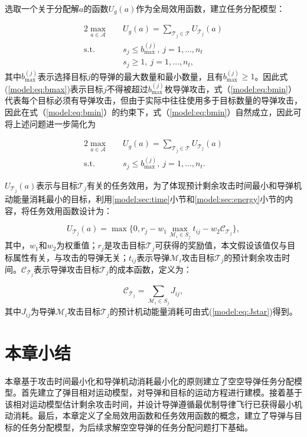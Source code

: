 选取一个关于分配解$a$的函数$U_g(a)$作为全局效用函数，建立任务分配模型：

\begin{alignat}{2}
	\label{model:eq:globalU} \max_{a \in \mathcal{A}} \quad & U_g(a) = \sum_{\mathcal{T}_j \in \mathcal{T}} U_{\mathcal T_j}(a)\\
	\mbox{s.t.} \quad 
	\label{model:eq:bmax} & s_j \leq b_{\text{max}}^{(j)},\ j=1,\dots,n_t\\
	\label{model:eq:bmin}& s_j \geq 1,\ j=1,\dots,n_t,
\end{alignat}
其中$b_{\text{max}}^{(j)}$表示选择目标$j$的导弹的最大数量和最小数量，且有$b_{\text{max}}^{(j)} \geq 1$。因此式(\ref{model:eq:bmax})表示目标$j$不得被超过$b_{\text{max}}^{(j)}$枚导弹攻击，式（\ref{model:eq:bmin}）代表每个目标必须有导弹攻击，但由于实际中往往使用多于目标数量的导弹攻击，因此在式（\ref{model:eq:bmin}）的约束下，式（\ref{model:eq:bmin}）自然成立，因此可将上述问题进一步简化为

\begin{alignat}{2}
	\label{model:eq:simUg} \max_{a \in \mathcal{A}} \quad & U_g(a) = \sum_{\mathcal{T}_j \in \mathcal{T}} U_{\mathcal T_j}(a)\\
	\mbox{s.t.} \quad 
	\label{model:eq:simbmax} & s_j \leq b_{\text{max}}^{(j)},\ j=1,\dots,n_t.
\end{alignat}

$U_{\mathcal T_j}(a)$表示与目标$\mathcal{T}_j$有关的任务效用，为了体现预计剩余攻击时间最小和导弹机动能量消耗最小的目标，利用\ref{model:sec:time}小节和\ref{model:sec:energy}小节的内容，将任务效用函数设计为：

\begin{equation}
\label{model:eq:taskU}
	U_{\mathcal{T}_j}(a) = \max \{ 0, r_j - w_1 \max_{\mathcal{M}_i \in S_j} t_{ij} -
	w_2 \mathcal{C}_{\mathcal{T}_j} \},
\end{equation}
其中，$w_1$和$w_2$为权重值；$r_j$是攻击目标$\mathcal{T}_j$可获得的奖励值，本文假设该值仅与目标属性有关，与攻击的导弹无关；$t_{ij}$表示导弹$\mathcal{M}_i$攻击目标$\mathcal{T}_j$的预计剩余攻击时间。$\mathcal{C}_{\mathcal{T}_j}$表示导弹攻击目标$\mathcal{T}_j$的成本函数，定义为：

\begin{equation}
\label{model:eq:costU}
	\mathcal{C}_{\mathcal{T}_j} = \sum_{\mathcal{M}_i \in S_j} J_{ij},
\end{equation}
其中$J_{ij}$为导弹$\mathcal{M}_i$攻击目标$\mathcal{T}_j$的预计机动能量消耗可由式(\ref{model:eq:Jstar})得到。

\section{本章小结}
\label{model:sec:conclusion}
本章基于攻击时间最小化和导弹机动消耗最小化的原则建立了空空导弹任务分配模型。首先建立了弹目相对运动模型，对导弹和目标的运动方程进行建模。接着基于该相对运动模型估计剩余攻击时间，并设计导弹遵循最优制导律飞行已获得最小机动消耗。最后，本章定义了全局效用函数和任务效用函数的概念，建立了导弹与目标的任务分配模型，为后续求解空空导弹的任务分配问题打下基础。














